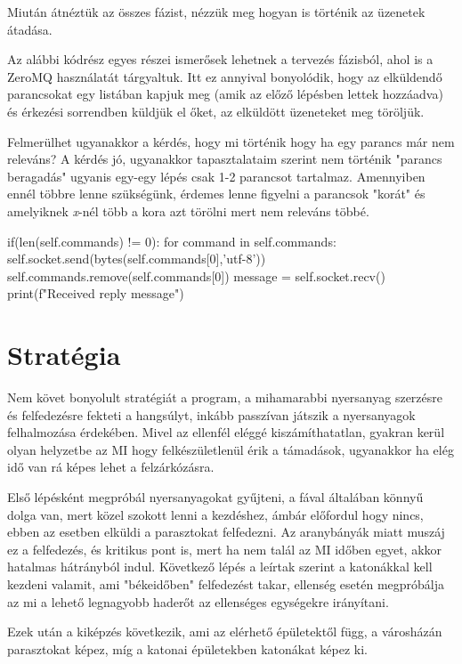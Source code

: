 Miután átnéztük az összes fázist, nézzük meg hogyan is történik az üzenetek átadása.

Az alábbi kódrész egyes részei ismerősek lehetnek a tervezés fázisból, ahol is a ZeroMQ használatát tárgyaltuk. Itt ez annyival bonyolódik, hogy az elküldendő parancsokat egy listában kapjuk meg (amik az előző lépésben lettek hozzáadva) és érkezési sorrendben küldjük el őket, az elküldött üzeneteket meg töröljük.

Felmerülhet ugyanakkor a kérdés, hogy mi történik hogy ha egy parancs már nem releváns? A kérdés jó, ugyanakkor tapasztalataim szerint nem történik "parancs beragadás" ugyanis egy-egy lépés csak 1-2 parancsot tartalmaz. Amennyiben ennél többre lenne szükségünk, érdemes lenne figyelni a parancsok "korát" és amelyiknek \textit{x}-nél több a kora azt törölni mert nem releváns többé.

\begin{python}
if(len(self.commands) != 0):
    for command in self.commands:
        self.socket.send(bytes(self.commands[0],'utf-8'))
        self.commands.remove(self.commands[0])
        message = self.socket.recv()
        print(f"Received reply {message}")
\end{python}
\section{Stratégia}

Nem követ bonyolult stratégiát a program, a mihamarabbi nyersanyag szerzésre és felfedezésre fekteti a hangsúlyt, inkább passzívan játszik a nyersanyagok felhalmozása érdekében. Mivel az ellenfél eléggé kiszámíthatatlan, gyakran kerül olyan helyzetbe az MI hogy felkészületlenül érik a támadások, ugyanakkor ha elég idő van rá képes lehet a felzárkózásra.

Első lépésként megpróbál nyersanyagokat gyűjteni, a fával általában könnyű dolga van, mert közel szokott lenni a kezdéshez, ámbár előfordul hogy nincs, ebben az esetben elküldi a parasztokat felfedezni. Az aranybányák miatt muszáj ez a felfedezés, és kritikus pont is, mert ha nem talál az MI időben egyet, akkor hatalmas hátrányból indul. 
Következő lépés a leírtak szerint a katonákkal kell kezdeni valamit, ami "békeidőben" felfedezést takar, ellenség esetén megpróbálja az mi a lehető legnagyobb haderőt az ellenséges egységekre irányítani.  

Ezek után a kiképzés következik, ami az elérhető épületektől függ, a városházán parasztokat képez, míg a katonai épületekben katonákat képez ki.


